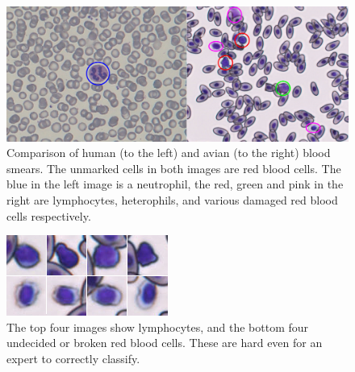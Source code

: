 \begin{figure}[h!]
    \centering
    \includegraphics[width=\textwidth]{comparison_marked_}
    \caption{Comparison of human (to the left) and avian (to the right) blood smears. The unmarked cells in both images are red blood cells. The blue in the left image is a neutrophil, the red, green and pink in the right are lymphocytes,  heterophils, and various damaged red blood cells respectively.}
    \label{fig:comparison}
\end{figure}

\begin{figure}[h!]
    \centering
    \includegraphics[width=\textwidth/2]{comparison_sneaky_}
    \caption{The top four images show lymphocytes, and the bottom four undecided or broken red blood cells. These are hard even for an expert to correctly classify.}
    \label{fig:sneaky}
\end{figure}
